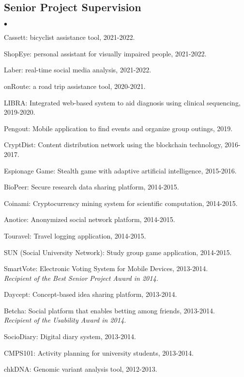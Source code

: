 \documentclass[margin,line]{res}
\newenvironment{list2}{
  \begin{list}{$\bullet$}{%
      \setlength{\itemsep}{0.1cm}
      \setlength{\parsep}{0in} \setlength{\parskip}{0in}
      \setlength{\topsep}{0in} \setlength{\partopsep}{0in} 
      \setlength{\leftmargin}{0.2in}}}{\end{list}}
\begin{document}
\begin{resume}
\subsection{\small \sc Senior Project Supervision}
\begin{list2}
\item Cassett: bicyclist assistance tool, 2021-2022.
\item ShopEye: personal assistant for visually impaired people, 2021-2022.
\item Laber: real-time social media analysis, 2021-2022.
\item onRoute: a road trip assistance tool, 2020-2021.
\item LIBRA: Integrated web-based system to aid diagnosis using clinical sequencing, 2019-2020.
\item Pengout: Mobile application to find events and organize group outings, 2019.
  \item CryptDist: Content distribution network using the blockchain technology, 2016-2017.
\item Espionage Game: Stealth game with adaptive artificial intelligence, 2015-2016.
  \item BioPeer: Secure research data sharing platform, 2014-2015.
  \item Coinami: Cryptocurrency mining system for scientific computation, 2014-2015.
  \item Anotice: Anonymized social network platform, 2014-2015.
  \item Touravel: Travel logging application, 2014-2015. 
  \item SUN (Social University Network): Study group game application, 2014-2015.
  \item SmartVote: Electronic Voting System for Mobile Devices, 2013-2014. \\
    {\it Recipient of the Best Senior Project Award in 2014.}
  \item Daycept: Concept-based idea sharing platform, 2013-2014.
  \item Betcha: Social platform that enables betting among friends, 2013-2014.\\
    {\it Recipient of the Usability Award in 2014.}
  \item SocioDiary: Digital diary system, 2013-2014.
  \item CMPS101: Activity planning for university students, 2013-2014.
  \item chkDNA: Genomic variant analysis tool, 2012-2013.
\end{list2}



\end{resume}
\end{document}
